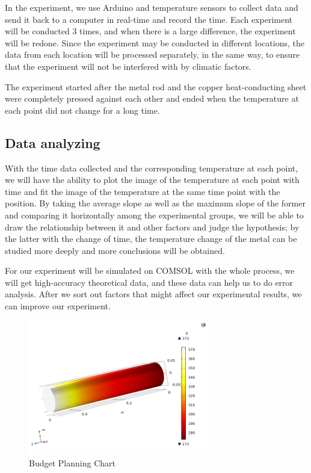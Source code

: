\documentclass[a4paper,12pt]{article}
\begin{document}
In the experiment, we use Arduino and temperature sensors to collect data and send it back to a computer in real-time and record the time. Each experiment will be conducted 3 times, and when there is a large difference, the experiment will be redone. Since the experiment may be conducted in different locations, the data from each location will be processed separately, in the same way, to ensure that the experiment will not be interfered with by climatic factors.


The experiment started after the metal rod and the copper heat-conducting sheet were completely pressed against each other and ended when the temperature at each point did not change for a long time.




\subsection{Data analyzing}
With the time data collected and the corresponding temperature at each point, we will have the ability to plot the image of the temperature at each point with time and fit the image of the temperature at the same time point with the position. By taking the average slope as well as the maximum slope of the former and comparing it horizontally among the experimental groups, we will be able to draw the relationship between it and other factors and judge the hypothesis; by the latter with the change of time, the temperature change of the metal can be studied more deeply and more conclusions will be obtained.


For our experiment will be simulated on COMSOL with the whole process, we will get high-accuracy theoretical data, and these data can help us to do error analysis. After we sort out factors that might affect our experimental results, we can improve our experiment.


\begin{figure}[H] %
\centering %
\includegraphics[width=0.7\textwidth]{COMSOL2.png} %
\caption{Budget Planning Chart} %
\end{figure}
\end{document}
